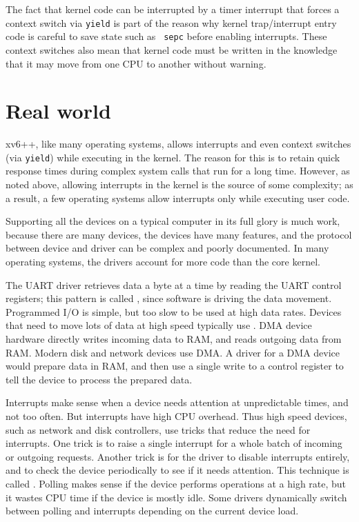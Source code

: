 The fact that kernel code can be interrupted by a timer interrupt that
forces a context switch via {\tt yield} is part of the reason why
kernel trap/interrupt entry code is careful to save state such as {\tt
  sepc} before enabling interrupts. These context switches also mean
that kernel code must be written in the knowledge that it may move
from one CPU to another without warning.

\section{Real world}

xv6++, like many operating systems, allows interrupts and even context
switches (via {\tt yield}) while executing in the kernel. The reason
for this is to retain quick response times during complex system calls
that run for a long time. However, as noted above, allowing interrupts
in the kernel is the source of some complexity; as a result, a few
operating systems allow interrupts only while executing user code.

Supporting all the devices on a typical computer in its full glory is
much work, because there are many devices, the devices have many
features, and the protocol between device and driver can be complex
and poorly documented. In many operating systems, the drivers account
for more code than the core kernel.

The UART driver retrieves data a byte at a time by reading the UART
control registers; this pattern is called , since
software is driving the data movement. Programmed I/O is simple, but
too slow to be used at high data rates. Devices that need to move lots
of data at high speed typically use .
DMA device hardware directly writes incoming data to RAM, and reads
outgoing data from RAM. Modern disk and network devices use DMA. A
driver for a DMA device would prepare data in RAM, and then use a
single write to a control register to tell the device to process the
prepared data.

Interrupts make sense when a device needs attention at unpredictable
times, and not too often. But interrupts have high CPU overhead. Thus
high speed devices, such as network and disk controllers, use tricks
that reduce the need for interrupts. One trick is to raise a single
interrupt for a whole batch of incoming or outgoing requests. Another
trick is for the driver to disable interrupts entirely, and to check
the device periodically to see if it needs attention. This technique
is called . Polling makes sense if the device performs
operations at a high rate, but it wastes CPU time if the device is mostly
idle. Some drivers dynamically switch between polling and interrupts
depending on the current device load.

